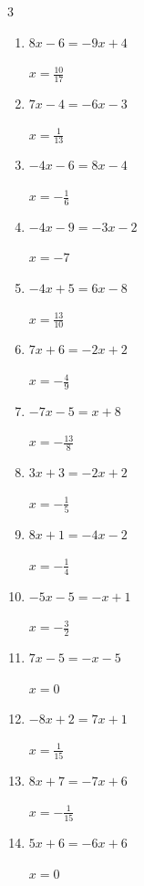\begin{multicols}{3}
\begin{enumerate}
        $\displaystyle x=-2$

  \item $8x-6=-9x+4$

        $\displaystyle x=\frac{10}{17}$

  \item $7x-4=-6x-3$

        $\displaystyle x=\frac{1}{13}$

  \item $-4x-6=8x-4$

        $\displaystyle x=-\frac{1}{6}$

  \item $-4x-9=-3x-2$

        $\displaystyle x=-7$

  \item $-4x+5=6x-8$

        $\displaystyle x=\frac{13}{10}$

  \item $7x+6=-2x+2$

        $\displaystyle x=-\frac{4}{9}$

  \item $-7x-5=x+8$

        $\displaystyle x=-\frac{13}{8}$

  \item $3x+3=-2x+2$

        $\displaystyle x=-\frac{1}{5}$

  \item $8x+1=-4x-2$

        $\displaystyle x=-\frac{1}{4}$

  \item $-5x-5=-x+1$

        $\displaystyle x=-\frac{3}{2}$

  \item $7x-5=-x-5$

        $\displaystyle x=0$

  \item $-8x+2=7x+1$

        $\displaystyle x=\frac{1}{15}$

\columnbreak %

  \item $8x+7=-7x+6$

        $\displaystyle x=-\frac{1}{15}$

  \item $5x+6=-6x+6$

        $\displaystyle x=0$


\end{enumerate}
\end{multicols}
